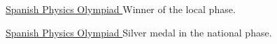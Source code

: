 \divider

\cvachievement{\faTrophy}
{\href{https://rsef.es/olimpiada-espanola-de-fisica}
  {Spanish Physics Olympiad \smallskip}}
{\small {}%
  \small{}}
Winner of the local phase.

\divider

\cvachievement{\faTrophy}
{\href{https://rsef.es/olimpiada-espanola-de-fisica}
  {Spanish Physics Olympiad \smallskip}}
{\small{}%
  \small{}}
Silver medal in the national phase.
